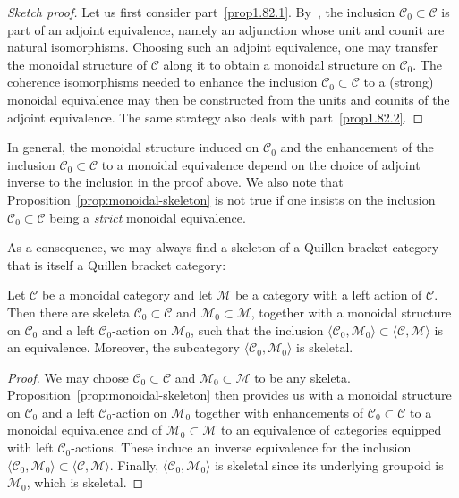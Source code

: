 \documentclass[AHL,Unicode,published]{cedram}
\newcommand{\cC}{\mathcal{C}}
\newcommand{\cM}{\mathcal{M}}
\begin{document}
\begin{proof}[Sketch proof]
Let us first consider part~\eqref{prop1.82.1}. By~\cite[Thm.~1, \S~IV.4]{MacLane1}, the inclusion $\cC_{0} \subset \cC$ is part of an adjoint equivalence, namely an adjunction whose unit and counit are natural isomorphisms. Choosing such an adjoint equivalence, one may transfer the monoidal structure of $\cC$ along it to obtain a monoidal structure on $\cC_{0}$. The coherence isomorphisms needed to enhance the inclusion $\cC_{0} \subset \cC$ to a (strong) monoidal equivalence may then be constructed from the units and counits of the adjoint equivalence. The same strategy also deals with part~\eqref{prop1.82.2}.
\end{proof}

\begin{rema}
In general, the monoidal structure induced on $\cC_{0}$ and the enhancement of the inclusion $\cC_{0} \subset \cC$ to a monoidal equivalence depend on the choice of adjoint inverse to the inclusion in the proof above. We also note that Proposition~\ref{prop:monoidal-skeleton} is not true if one insists on the inclusion $\cC_{0} \subset \cC$ being a \emph{strict} monoidal equivalence.
\end{rema}

As a consequence, we may always find a skeleton of a Quillen bracket category that is itself a Quillen bracket category:

\begin{coro}\label{coro:QBC-skeleton}
Let $\cC$ be a monoidal category and let $\cM$ be a category with a left action of $\cC$. Then there are skeleta $\cC_{0} \subset \cC$ and $\cM_{0} \subset \cM$, together with a monoidal structure on $\cC_{0}$ and a left $\cC_{0}$-action on $\cM_{0}$, such that the inclusion $\langle \cC_{0}, \cM_{0} \rangle \subset \langle \cC, \cM \rangle$ is an equivalence. Moreover, the subcategory $\langle \cC_{0}, \cM_{0} \rangle$ is skeletal.
\end{coro}
\begin{proof}
We may choose $\cC_{0} \subset \cC$ and $\cM_{0} \subset \cM$ to be any skeleta. Proposition~\ref{prop:monoidal-skeleton} then provides us with a monoidal structure on $\cC_{0}$ and a left $\cC_{0}$-action on $\cM_{0}$ together with enhancements of $\cC_{0} \subset \cC$ to a monoidal equivalence and of $\cM_{0} \subset \cM$ to an equivalence of categories equipped with left $\cC_{0}$-actions. These induce an inverse equivalence for the inclusion $\langle \cC_{0}, \cM_{0} \rangle \subset \langle \cC, \cM \rangle$. Finally, $\langle \cC_{0}, \cM_{0} \rangle$ is skeletal since its underlying groupoid is $\cM_{0}$, which is skeletal.
\end{proof}
\end{document}
